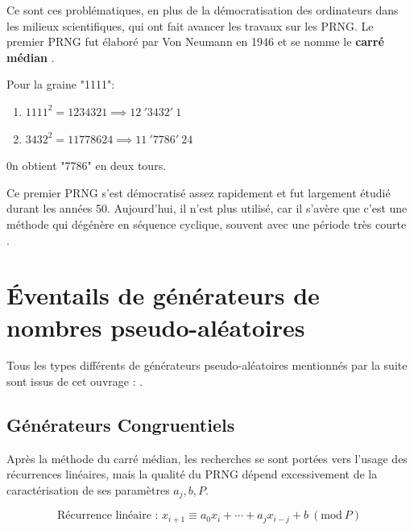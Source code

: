 \documentclass[9pt,a4paper,twoside,english]{class/backend}
\begin{document}
    Ce sont ces problématiques, en plus de la démocratisation des ordinateurs dans les milieux scientifiques, qui ont fait avancer les travaux sur les PRNG. Le premier PRNG fut élaboré par Von Neumann en 1946 et se nomme le \textbf{carré médian} \cite{VN_algo}. 
    
    \begin{rhoenv}[frametitle = {\citetitle{VN_algo}}]
        Pour la graine "1111":
        \begin{enumerate}
            \item $1111^2 = 1234321 \implies 12 \ '3432'\ 1 $
            \item $3432^2 = 11778624 \implies 11\ '7786'\ 24 $
        \end{enumerate}
        0n obtient "7786" en deux tours.
    \end{rhoenv}
    
    
    Ce premier PRNG s'est démocratisé assez rapidement et fut largement étudié durant les années 50. Aujourd'hui, il n'est plus utilisé, car il s'avère que c'est une méthode qui dégénère en séquence cyclique, souvent avec une période très courte \cite{SyposiumMonteCarlo}.


\section{Éventails de générateurs de nombres pseudo-aléatoires}

    \hspace{10pt}Tous les types différents de générateurs pseudo-aléatoires mentionnés par la suite sont issus de cet ouvrage :  \cite{MonteCarloPRNG}.\smallskip
    
    \subsection{Générateurs Congruentiels}\smallskip

    \hspace{10pt}Après la méthode du carré médian, les recherches se sont portées vers l'usage des récurrences linéaires, mais la qualité du PRNG dépend excessivement de la caractérisation de ses paramètres $a_j, b, P$.
     
        \begin{equation}{\text{Récurrence linéaire : }}
            x_{i+1} \equiv a_0 x_i + \cdots + a_j x_{i-j} + b \ (\text{mod} \ P)    
        \end{equation}
    
\end{document}
